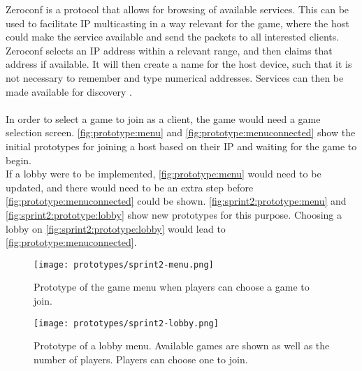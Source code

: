 Zeroconf is a protocol that allows for browsing of available services.
This can be used to facilitate IP multicasting in a way relevant for the game, where the host could make the service available and send the packets to all interested clients.
Zeroconf selects an IP address within a relevant range, and then claims that address if available.
It will then create a name for the host device, such that it is not necessary to remember and type numerical addresses.
Services can then be made available for discovery \cite{zeroconf}.
\\\\
In order to select a game to join as a client, the game would need a game selection screen.
\autoref{fig:prototype:menu} and \autoref{fig:prototype:menuconnected} show the initial prototypes for joining a host based on their IP and waiting for the game to begin.\\
If a lobby were to be implemented, \autoref{fig:prototype:menu} would need to be updated, and there would need to be an extra step before \autoref{fig:prototype:menuconnected} could be shown.
\autoref{fig:sprint2:prototype:menu} and \autoref{fig:sprint2:prototype:lobby} show new prototypes for this purpose.
Choosing a lobby on \autoref{fig:sprint2:prototype:lobby} would lead to \autoref{fig:prototype:menuconnected}.
\begin{figure}[H]
    \centering
    \texttt{[image: prototypes/sprint2-menu.png]}
    \caption{Prototype of the game menu when players can choose a game to join.}
    \label{fig:sprint2:prototype:menu}
\end{figure}

\begin{figure}[H]
    \centering
    \texttt{[image: prototypes/sprint2-lobby.png]}
    \caption{Prototype of a lobby menu. Available games are shown as well as the number of players. Players can choose one to join.}
    \label{fig:sprint2:prototype:lobby}
\end{figure}
